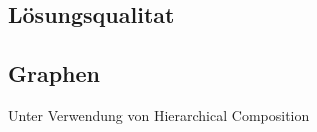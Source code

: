 \begin{figure}
    \centering
    \subfigure{
        \centering
        \resizebox{0.45\linewidth}{!}{
            
        }
    }
    \subfigure{
        \centering
        \resizebox{0.45\linewidth}{!}{
            
        }
    }
    \subfigure{
        \centering
        \resizebox{0.45\linewidth}{!}{
            
        }
    }
\end{figure}

\subsection{Lösungsqualitat}
\subsection{Graphen}
Unter Verwendung von Hierarchical Composition

